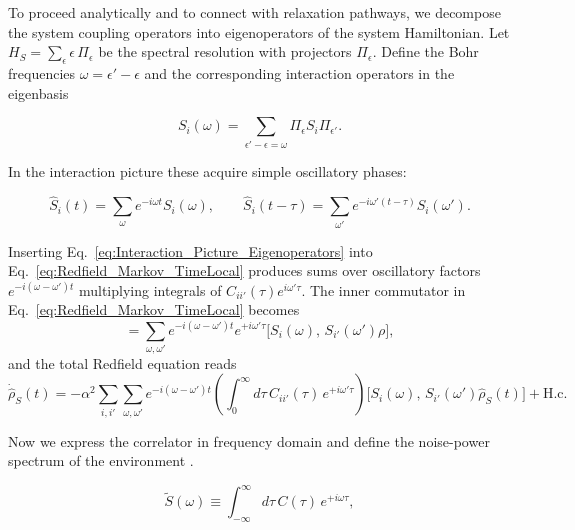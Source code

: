 \noindent
To proceed analytically and to connect with relaxation pathways, we decompose the system coupling operators into eigenoperators of the system Hamiltonian. Let $H_S = \sum_{\epsilon} \epsilon \, \Pi_{\epsilon}$ be the spectral resolution with projectors $\Pi_{\epsilon}$. Define the Bohr frequencies $\omega = \epsilon' - \epsilon$ and the corresponding interaction operators in the eigenbasis

\begin{equation}
	S_i(\omega) = \sum_{\epsilon' - \epsilon = \omega} \Pi_{\epsilon} S_i \Pi_{\epsilon'}.
	\label{eq:Eigenoperator_Decomposition}
\end{equation}

\noindent
In the interaction picture these acquire simple oscillatory phases:

\begin{equation}
	\hat{S}_i(t) = \sum_{\omega} e^{-i \omega t} S_i(\omega), \qquad \hat{S}_i(t-\tau) = \sum_{\omega'} e^{-i \omega'(t-\tau)} S_i(\omega').
	\label{eq:Interaction_Picture_Eigenoperators}
\end{equation}

\noindent
Inserting Eq.~\eqref{eq:Interaction_Picture_Eigenoperators} into Eq.~\eqref{eq:Redfield_Markov_TimeLocal} produces sums over oscillatory factors $e^{-i(\omega - \omega') t}$ multiplying integrals of $C_{ii'}(\tau) e^{i \omega' \tau}$. The inner commutator in Eq.~\eqref{eq:Redfield_Markov_TimeLocal} becomes
\begin{equation}
[\hat{S}_i(t),\, \hat{S}_{i'}(t-\tau)\rho]
= \sum_{\omega,\omega'} e^{-i(\omega - \omega')t} e^{+i \omega' \tau}
\big[ S_i(\omega),\, S_{i'}(\omega') \rho \big],
\tag{3}
\end{equation}
and the total Redfield equation reads
\begin{equation}
	\dot{\hat{\rho}}_S(t) = -\alpha^2 \sum_{i,i'} \sum_{\omega,\omega'} e^{-i(\omega - \omega')t}
	\left( \int_0^{\infty} d\tau\, C_{ii'}(\tau)\, e^{+i \omega' \tau} \right)
	\big[ S_i(\omega),\, S_{i'}(\omega') \hat{\rho}_S(t) \big]
	+ \text{H.c.}
	\label{eq:Redfield_Frequency_Decomposed}
\end{equation}

\noindent
Now we express the correlator in frequency domain and define the noise-power spectrum of the environment \cite{lambertetal2024qutip5quantum}.

\begin{equation}
	\tilde{S}(\omega) \equiv \int_{-\infty}^{\infty} d\tau\, C(\tau)\, e^{+i \omega \tau},
	\label{eq:Noise_Power_Spectrum}
\end{equation}


